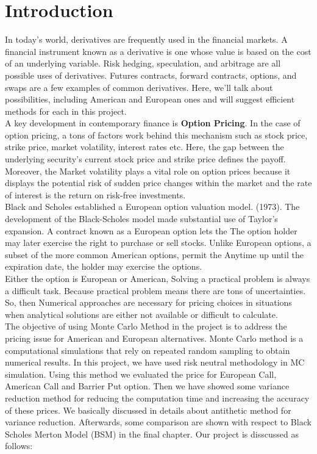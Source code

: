 \chapter{Introduction}
\noindent In today's world, derivatives are frequently used in the financial markets. A financial instrument known as a derivative is one whose value is based on the cost of an underlying variable. Risk hedging, speculation, and arbitrage are all possible uses of derivatives. Futures contracts, forward contracts, options, and swaps are a few examples of common derivatives. Here, we'll talk about possibilities, including American and European ones and will suggest efficient methods for each in this project. \\[2mm]
\noindent A key development in contemporary finance is \textbf {Option Pricing}. In the case of option pricing, a tons of factors work behind this mechanism such as stock price, strike price, market volatility, interest rates etc. Here, the gap between the underlying security's current stock price and strike price defines the payoff. Moreover, the Market
volatility plays a vital role on option prices because it displays the potential risk
of sudden price changes within the market and the rate of interest is the return
on risk-free investments.\\[-3mm]

\noindent Black and Scholes established a European option valuation model. (1973). The development of the Black-Scholes model made substantial use of Taylor's expansion. A contract known as a European option lets the The option holder may later exercise the right to purchase or sell stocks. Unlike European options, a subset of the more common American options, permit the Anytime up until the expiration date, the holder may exercise the options. \\[2mm]
Either the option is European or American, Solving a practical problem is always a difficult task. Because practical problem means there are tons of uncertainties. So, then Numerical approaches are necessary for pricing choices in situations when analytical solutions are either not available or difficult to calculate. \\[2mm]
The objective of using Monte Carlo Method in the project is to address the pricing issue for American and European alternatives. Monte Carlo method is a computational simulations that rely on repeated random sampling to obtain numerical results. In this project, we have used risk neutral methodology in MC simulation. Using this method we evaluated the price for European Call, American Call and Barrier Put option. Then we have showed some variance reduction method for reducing the computation time and increasing the accuracy of these prices. We basically discussed in details about antithetic method for variance reduction. Afterwards, some comparison are shown with respect to Black Scholes Merton Model (BSM) in the final chapter. 
Our project is disscussed as follows:

